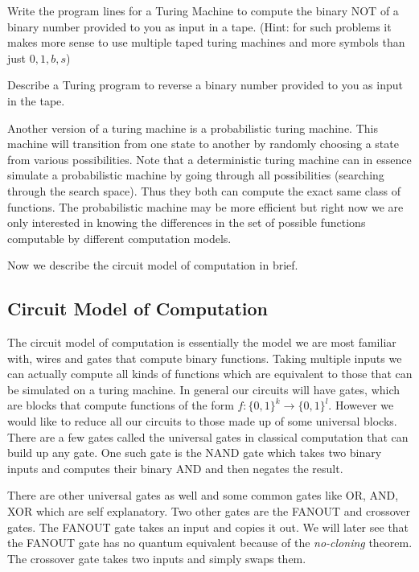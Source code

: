 \begin{exercise}
Write the program lines for a Turing Machine to compute the binary NOT of a binary number provided to you as input in a tape.
(Hint: for such problems it makes more sense to use multiple taped turing machines and more symbols than just $0, 1, b, s$)
\end{exercise}
\begin{exercise}
Describe a Turing program to reverse a binary number provided to you as input in the tape.
\end{exercise}
Another version of a turing machine is a probabilistic turing machine. This machine will transition from one state to another by randomly choosing a state from various possibilities. Note that a deterministic turing machine can in essence simulate a probabilistic machine by going through all possibilities (searching through the search space). Thus they both can compute the exact same class of functions. The probabilistic machine may be more efficient but right now we are only interested in knowing the differences in the set of possible functions computable by different computation models.

Now we describe the circuit model of computation in brief.
\clearpage

\subsection{Circuit Model of Computation}
The circuit model of computation is essentially the model we are most familiar with, wires and gates that compute binary functions. Taking multiple inputs we can actually compute all kinds of functions which are equivalent to those that can be simulated on a turing machine.  In general our circuits will have gates, which are blocks that compute functions of the form $f : \{0, 1 \}^{k} \to \{0, 1\}^{l}$. However we would like to reduce all our circuits to those made up of some universal blocks. There are a few gates called the universal gates in classical computation that can build up any gate. One such gate is the NAND gate which takes two binary inputs and computes their binary AND and then negates the result.

There are other universal gates as well and some common gates like OR, AND, XOR which are self explanatory. Two other gates are the FANOUT and crossover gates. The FANOUT gate takes an input and copies it out. We will later see that the FANOUT gate has no quantum equivalent because of the \textit{no-cloning} theorem. The crossover gate takes two inputs and simply swaps them.


